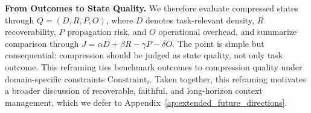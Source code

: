 
\noindent\textbf{From Outcomes to State Quality.} We therefore evaluate compressed states through \(Q=(D,R,P,O)\), where \(D\) denotes task-relevant density, \(R\) recoverability, \(P\) propagation risk, and \(O\) operational overhead, and summarize comparison through \(J=\alpha D+\beta R-\gamma P-\delta O\). The point is simple but consequential: compression should be judged as state quality, not only task outcome. This reframing ties benchmark outcomes to compression quality under domain-specific constraints \(\mathrm{Constraint}_i\).
Taken together, this reframing motivates a broader discussion of recoverable, faithful, and long-horizon context management, which we defer to Appendix~\ref{ap:extended_future_directions}.

